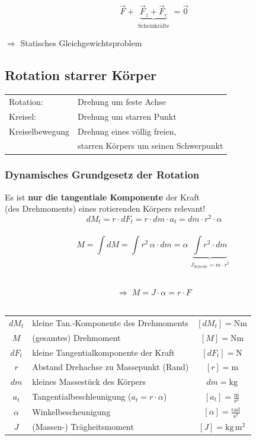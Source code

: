 			$$ \boxed{ \vec{F} + \underbrace{ \vec{F}_z + \vec{F}_c }_{\substack{\text{Scheinkräfte}}} = \vec{0} }$$ 
			
			$\Rightarrow$ Statisches Gleichgewichtsproblem

	\subsection{Rotation starrer Körper}
	
		\begin{tabular}{ll}
			Rotation: & Drehung um feste Achse \\
			Kreisel: & Drehung um starren Punkt \\
			Kreiselbewegung & Drehung eines völlig freien, \\
			&  starren Körpers um seinen Schwerpunkt \\
		\end{tabular}

		\subsubsection{Dynamisches Grundgesetz der Rotation}
			Es ist \textbf{nur die tangentiale Komponente} der Kraft \\
			(des Drehmoments) eines rotierenden Körpers relevant! \\
				
			$$dM_t = r \cdot dF_t = r \cdot dm \cdot a_t = dm \cdot r^2 \cdot \alpha$$ \\
			
			$$ \boxed{ M = \int dM = \int r^2 \, \alpha \cdot dm = \alpha  \underbrace{  \int r^2 \cdot dm }_{\substack{J_{Scheibe} = m \cdot r^2}} }$$ \
			
			$$ \boxed{ \Rightarrow \; M = J \cdot \alpha = r \cdot F} $$ \\
				
			\begin{tabular}{c l c}
				$dM_t$ & kleine Tan.-Komponente des Drehmoments & $[dM_t] = \mathrm{Nm}$ \\
				$M$ & (gesamtes) Drehmoment & $[M] = \mathrm{Nm}$ \\
				$dF_t$ & kleine Tangentialkomponente der Kraft & $[dF_t] = \mathrm{N}$ \\
				$r$ & Abstand Drehachse zu Massepunkt (Rand) & $[r] = \mathrm{m}$ \\
				$dm$ & kleines Massestück des Körpers & $dm = \mathrm{kg}$ \\
				$a_t$ & Tangentialbeschleunigung ($a_t = r \cdot \alpha$) & $[a_t] = \mathrm{\frac{m}{s^2}}$ \\
				$\alpha$ & Winkelbescheunigung & $[\alpha] = \mathrm{\frac{rad}{s^2}}$ \\
				$J$ & (Massen-) Trägheitsmoment & $[J] = \mathrm{kg \, m^2}$ \\
			\end{tabular}

